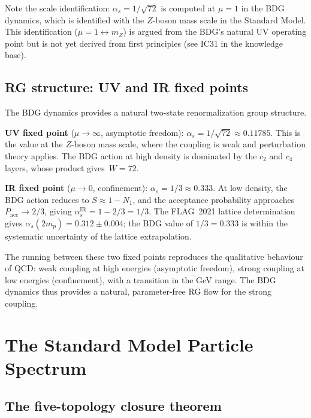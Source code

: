 \documentclass[12pt,a4paper]{article}
\begin{document}
Note the scale identification: $\alpha_s = 1/\sqrt{72}$ is computed at $\mu=1$ in the BDG dynamics, which is identified with the $Z$-boson mass scale in the Standard Model. This identification ($\mu=1 \leftrightarrow m_Z$) is argued from the BDG's natural UV operating point but is not yet derived from first principles (see IC31 in the knowledge base).

\subsection{RG structure: UV and IR fixed points}\label{sec:rg}

The BDG dynamics provides a natural two-state renormalization group structure.

\textbf{UV fixed point} ($\mu \to \infty$, asymptotic freedom): $\alpha_s = 1/\sqrt{72} \approx 0.11785$. This is the value at the $Z$-boson mass scale, where the coupling is weak and perturbation theory applies. The BDG action at high density is dominated by the $c_2$ and $c_4$ layers, whose product gives~$W=72$.

\textbf{IR fixed point} ($\mu \to 0$, confinement): $\alpha_s = 1/3 \approx 0.333$. At low density, the BDG action reduces to $S \approx 1 - N_1$, and the acceptance probability approaches $P_{\mathrm{acc}} \to 2/3$, giving $\alpha_s^{\mathrm{IR}} = 1 - 2/3 = 1/3$. The FLAG~2021 lattice determination gives $\alpha_s(2m_p) = 0.312 \pm 0.004$; the BDG value of $1/3 = 0.333$ is within the systematic uncertainty of the lattice extrapolation.

The running between these two fixed points reproduces the qualitative behaviour of QCD: weak coupling at high energies (asymptotic freedom), strong coupling at low energies (confinement), with a transition in the GeV range. The BDG dynamics thus provides a natural, parameter-free RG flow for the strong coupling.

\section{The Standard Model Particle Spectrum}\label{sec:spectrum}

\subsection{The five-topology closure theorem}\label{sec:closure}
\end{document}
